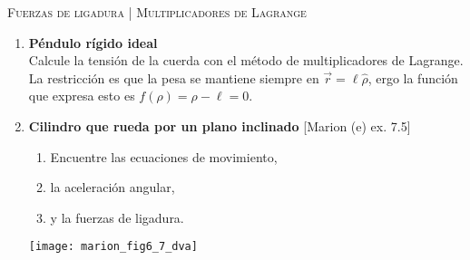 \documentclass[11pt, spanish, a4paper, twoside]{article}
\begin{document}
\begin{center}
  \textsc{\large Fuerzas de ligadura | Multiplicadores de Lagrange} 
\end{center}

\begin{enumerate}

	\item
	\begin{minipage}[t][0cm]{0.7\textwidth}
		\textbf{Péndulo rígido ideal}\\
		Calcule la tensión de la cuerda con el método de multiplicadores de Lagrange.
		La restricción es que la pesa se mantiene siempre en \(\vec{r} = \ell \hat{\rho}\), ergo la función que expresa esto es \(f(\rho) = \rho - \ell = 0\).
	\end{minipage}
	\begin{minipage}[c][0cm][t]{0.25\textwidth}
		
	\end{minipage}



	\item 
	\begin{minipage}[t][3cm]{0.47\textwidth}
	\textbf{Cilindro que rueda por un plano inclinado} [Marion (e) ex. 7.5]\\
		\begin{enumerate}
			\item Encuentre las ecuaciones de movimiento, 
			\item la aceleración angular,
			\item y la fuerzas de ligadura. 
		\end{enumerate}
	\end{minipage}
	\begin{minipage}[c][2cm][t]{0.3\textwidth}
		\texttt{[image: marion\_fig6\_7\_dva]}
	\end{minipage}


\end{enumerate}
\end{document}
